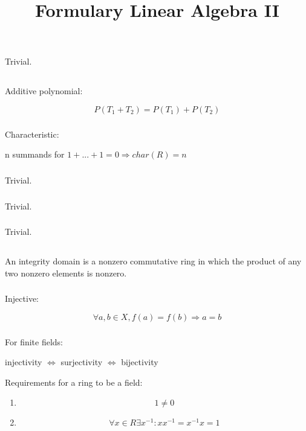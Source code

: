 \documentclass{report}
\title{Formulary Linear Algebra II}
\begin{document}
\chapter{}

\section{}
Trivial.
\section{}
Additive polynomial:

$$P(T_1 + T_2)=P(T_1)+P(T_2)$$
\subsection{}
Characteristic:

n summands for $1+...+1=0 \Rightarrow char(R)=n$
\subsection{}
Trivial.
\subsection{}
Trivial.
\subsection{}
Trivial.
\section{}
An integrity domain is a nonzero commutative ring in which the product of any two nonzero elements is nonzero.
\subsection{}
Injective:

$$\forall a,b \in X,f(a)=f(b) \Rightarrow a=b$$
\subsection{}
For finite fields:

injectivity $\Leftrightarrow$ surjectivity $\Leftrightarrow$ bijectivity

Requirements for a ring to be a field:

\begin{enumerate}
\item $$1\neq0$$
\item $$\forall x\in R \exists x^{-1}:xx^{-1}=x^{-1}x=1$$
\end{enumerate}
\end{document}
